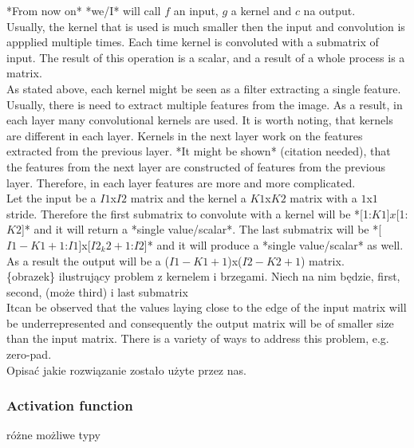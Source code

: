\documentclass[a4paper,10pt]{report}
\begin{document}
	  *From now on* *we/I* will call $f$ an input, $g$ a kernel and $c$ na output.\\
	  
	  Usually, the kernel that is used is much smaller then the input and convolution is appplied multiple times. Each time kernel is convoluted with a submatrix of input. The result of this operation is a scalar, and a result of a whole process is a matrix.\\
	  
	  As stated above, each kernel might be seen as a filter extracting a single feature. Usually, there is need to extract multiple features from the image. As a result, in each layer many convolutional kernels are used. It is worth noting, that kernels are different in each layer. Kernels in the next layer work on the features extracted from the previous layer. *It might be shown* (citation needed), that the features from the next layer are constructed of features from the previous layer. Therefore, in each layer features are more and more complicated.\\
	  
	  Let the input be a $I1$x$I2$ matrix and the kernel a $K1$x$K2$ matrix with a $1$x$1$ stride. Therefore the first submatrix to convolute with a kernel will be *[1:$K1$]$x$[1:$K2$]* and it will return a *single value/scalar*. The last submatrix will be *[$I1-K1+1$:$I1$]x[$I2_k2+1$:$I2$]* and it will produce a  *single value/scalar* as well. As a result the output will be a ($I1-K1+1$)x($I2-K2+1$) matrix.\\
	  
	  \{obrazek\} ilustrujący problem z kernelem i brzegami. Niech na nim będzie, first, second, (może third) i last submatrix\\
	  
	  Itcan be observed that the values laying close to the edge of the input matrix will be underrepresented and consequently the output matrix will be of smaller size than the input matrix. There is a variety of ways to address this problem, e.g. zero-pad.\\
	  
	  
	  Opisać jakie rozwiązanie zostało użyte przez nas. %
	
	\subsubsection{Activation function} %
	  różne możliwe typy\\
	
\end{document}
